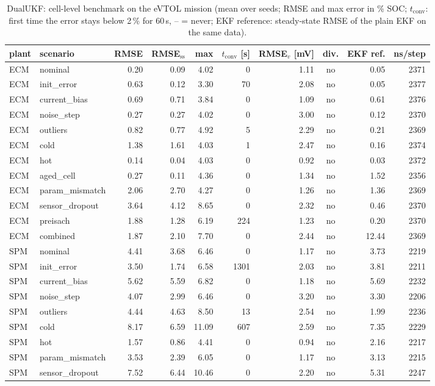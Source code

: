 \begin{table}[H]\centering\footnotesize\setlength{\tabcolsep}{4pt}
\caption{DualUKF: cell-level benchmark on the eVTOL mission (mean over seeds; RMSE and max error in \% SOC; $t_\mathrm{conv}$: first time the error stays below 2\,\% for 60\,s, -- = never; EKF reference: steady-state RMSE of the plain EKF on the same data).}\label{tab:cell_DualUKF}
\begin{tabular}{llrrrrrcrr}\toprule
plant & scenario & RMSE & RMSE$_\mathrm{ss}$ & max & $t_\mathrm{conv}$ [s] & RMSE$_v$ [mV] & div. & EKF ref. & ns/step \\ \midrule
ECM & nominal & 0.20 & 0.09 & 4.02 & 0 & 1.11 & no & 0.05 & 2371 \\
ECM & init\_error & 0.63 & 0.12 & 3.30 & 70 & 2.08 & no & 0.05 & 2377 \\
ECM & current\_bias & 0.69 & 0.71 & 3.84 & 0 & 1.09 & no & 0.61 & 2376 \\
ECM & noise\_step & 0.27 & 0.27 & 4.02 & 0 & 3.00 & no & 0.12 & 2370 \\
ECM & outliers & 0.82 & 0.77 & 4.92 & 5 & 2.29 & no & 0.21 & 2369 \\
ECM & cold & 1.38 & 1.61 & 4.03 & 1 & 2.47 & no & 0.16 & 2374 \\
ECM & hot & 0.14 & 0.04 & 4.03 & 0 & 0.92 & no & 0.03 & 2372 \\
ECM & aged\_cell & 0.27 & 0.11 & 4.36 & 0 & 1.34 & no & 1.52 & 2356 \\
ECM & param\_mismatch & 2.06 & 2.70 & 4.27 & 0 & 1.26 & no & 1.36 & 2369 \\
ECM & sensor\_dropout & 3.64 & 4.12 & 8.65 & 0 & 2.32 & no & 0.46 & 2370 \\
ECM & preisach & 1.88 & 1.28 & 6.19 & 224 & 1.23 & no & 0.20 & 2370 \\
ECM & combined & 1.87 & 2.10 & 7.70 & 0 & 2.44 & no & 12.44 & 2369 \\
\midrule
SPM & nominal & 4.41 & 3.68 & 6.46 & 0 & 1.17 & no & 3.73 & 2219 \\
SPM & init\_error & 3.50 & 1.74 & 6.58 & 1301 & 2.03 & no & 3.81 & 2211 \\
SPM & current\_bias & 5.62 & 5.59 & 6.82 & 0 & 1.18 & no & 5.69 & 2232 \\
SPM & noise\_step & 4.07 & 2.99 & 6.46 & 0 & 3.20 & no & 3.30 & 2206 \\
SPM & outliers & 4.44 & 4.63 & 8.50 & 13 & 2.54 & no & 1.99 & 2236 \\
SPM & cold & 8.17 & 6.59 & 11.09 & 607 & 2.59 & no & 7.35 & 2229 \\
SPM & hot & 1.57 & 0.86 & 4.41 & 0 & 0.94 & no & 2.16 & 2217 \\
SPM & param\_mismatch & 3.53 & 2.39 & 6.05 & 0 & 1.17 & no & 3.13 & 2215 \\
SPM & sensor\_dropout & 7.52 & 6.44 & 10.46 & 0 & 2.20 & no & 5.31 & 2247 \\
\bottomrule\end{tabular}\end{table}
